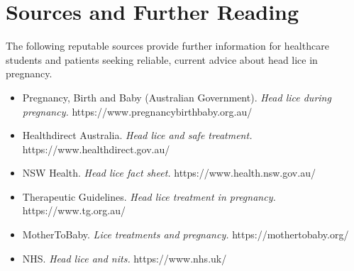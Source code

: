 \section*{Sources and Further Reading}
The following reputable sources provide further information for healthcare students and patients seeking reliable, current advice about head lice in pregnancy.

\begin{itemize}
    \item Pregnancy, Birth and Baby (Australian Government). \textit{Head lice during pregnancy.} https://www.pregnancybirthbaby.org.au/
    \item Healthdirect Australia. \textit{Head lice and safe treatment.} https://www.healthdirect.gov.au/
    \item NSW Health. \textit{Head lice fact sheet.} https://www.health.nsw.gov.au/
    \item Therapeutic Guidelines. \textit{Head lice treatment in pregnancy.} https://www.tg.org.au/
    \item MotherToBaby. \textit{Lice treatments and pregnancy.} https://mothertobaby.org/
    \item NHS. \textit{Head lice and nits.} https://www.nhs.uk/
\end{itemize}
